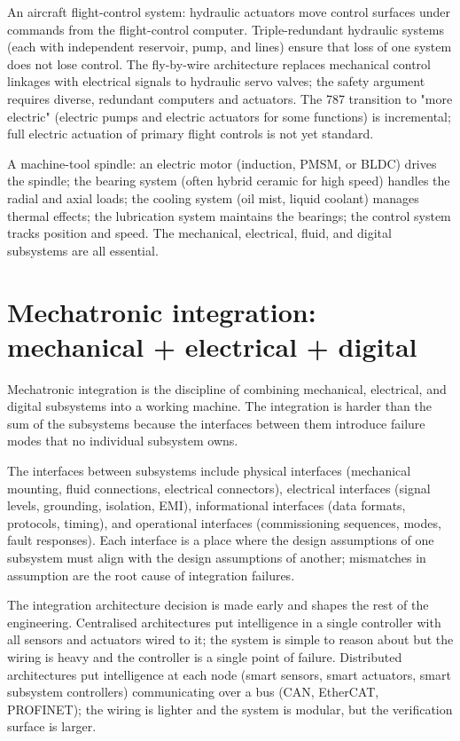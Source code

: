 An aircraft flight-control system: hydraulic actuators move control surfaces under commands from the flight-control computer. Triple-redundant hydraulic systems (each with independent reservoir, pump, and lines) ensure that loss of one system does not lose control. The fly-by-wire architecture replaces mechanical control linkages with electrical signals to hydraulic servo valves; the safety argument requires diverse, redundant computers and actuators. The 787 transition to "more electric" (electric pumps and electric actuators for some functions) is incremental; full electric actuation of primary flight controls is not yet standard.

A machine-tool spindle: an electric motor (induction, PMSM, or BLDC) drives the spindle; the bearing system (often hybrid ceramic for high speed) handles the radial and axial loads; the cooling system (oil mist, liquid coolant) manages thermal effects; the lubrication system maintains the bearings; the control system tracks position and speed. The mechanical, electrical, fluid, and digital subsystems are all essential.

\section{Mechatronic integration: mechanical + electrical + digital}

Mechatronic integration is the discipline of combining mechanical, electrical, and digital subsystems into a working machine. The integration is harder than the sum of the subsystems because the interfaces between them introduce failure modes that no individual subsystem owns.

The interfaces between subsystems include physical interfaces (mechanical mounting, fluid connections, electrical connectors), electrical interfaces (signal levels, grounding, isolation, EMI), informational interfaces (data formats, protocols, timing), and operational interfaces (commissioning sequences, modes, fault responses). Each interface is a place where the design assumptions of one subsystem must align with the design assumptions of another; mismatches in assumption are the root cause of integration failures.

The integration architecture decision is made early and shapes the rest of the engineering. Centralised architectures put intelligence in a single controller with all sensors and actuators wired to it; the system is simple to reason about but the wiring is heavy and the controller is a single point of failure. Distributed architectures put intelligence at each node (smart sensors, smart actuators, smart subsystem controllers) communicating over a bus (CAN, EtherCAT, PROFINET); the wiring is lighter and the system is modular, but the verification surface is larger.

